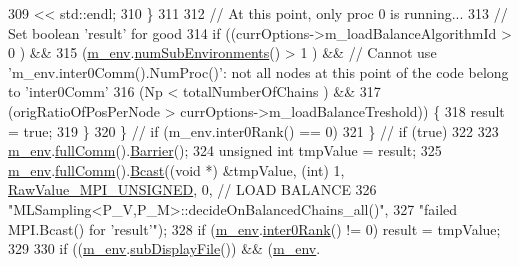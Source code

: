 \begin{DoxyCode}
309                                 << std::endl;
310       \}
311 
312       \textcolor{comment}{// At this point, only proc 0 is running...}
313       \textcolor{comment}{// Set boolean 'result' for good}
314       \textcolor{keywordflow}{if} ((currOptions->m\_loadBalanceAlgorithmId > 0                                 ) &&
315           (\hyperlink{class_q_u_e_s_o_1_1_m_l_sampling_a13f1ca4fe9f94822fe572a743eaced1d}{m\_env}.\hyperlink{class_q_u_e_s_o_1_1_base_environment_ac0345f57e31ef7833e379ed972bd094d}{numSubEnvironments}()            > 1                                
       ) && \textcolor{comment}{// Cannot use 'm\_env.inter0Comm().NumProc()': not all nodes at this point of the code belong to
       'inter0Comm'}
316           (Np                                    < totalNumberOfChains               ) &&
317           (origRatioOfPosPerNode                 > currOptions->m\_loadBalanceTreshold)) \{
318         result = \textcolor{keyword}{true};
319       \}
320     \} \textcolor{comment}{// if (m\_env.inter0Rank() == 0)}
321   \} \textcolor{comment}{// if (true)}
322 
323   \hyperlink{class_q_u_e_s_o_1_1_m_l_sampling_a13f1ca4fe9f94822fe572a743eaced1d}{m\_env}.\hyperlink{class_q_u_e_s_o_1_1_base_environment_a0b0779b41ff304058856e97e1d16b4d4}{fullComm}().\hyperlink{class_q_u_e_s_o_1_1_mpi_comm_a4059971c30e023b272fccaa6aa00c426}{Barrier}();
324   \textcolor{keywordtype}{unsigned} \textcolor{keywordtype}{int} tmpValue = result;
325   \hyperlink{class_q_u_e_s_o_1_1_m_l_sampling_a13f1ca4fe9f94822fe572a743eaced1d}{m\_env}.\hyperlink{class_q_u_e_s_o_1_1_base_environment_a0b0779b41ff304058856e97e1d16b4d4}{fullComm}().\hyperlink{class_q_u_e_s_o_1_1_mpi_comm_abd6af8db8b0c7fd2f5b62e26477a9537}{Bcast}((\textcolor{keywordtype}{void} *) &tmpValue, (\textcolor{keywordtype}{int}) 1, 
      \hyperlink{_mpi_comm_8h_a06cbfbc33436f6e0dc8a48ff3c49bdfc}{RawValue\_MPI\_UNSIGNED}, 0, \textcolor{comment}{// LOAD BALANCE}
326                          \textcolor{stringliteral}{"MLSampling<P\_V,P\_M>::decideOnBalancedChains\_all()"},
327                          \textcolor{stringliteral}{"failed MPI.Bcast() for 'result'"});
328   \textcolor{keywordflow}{if} (\hyperlink{class_q_u_e_s_o_1_1_m_l_sampling_a13f1ca4fe9f94822fe572a743eaced1d}{m\_env}.\hyperlink{class_q_u_e_s_o_1_1_base_environment_ae106b5bb8a80b655b88b3a26b1e7c185}{inter0Rank}() != 0) result = tmpValue;
329 
330   \textcolor{keywordflow}{if} ((\hyperlink{class_q_u_e_s_o_1_1_m_l_sampling_a13f1ca4fe9f94822fe572a743eaced1d}{m\_env}.\hyperlink{class_q_u_e_s_o_1_1_base_environment_a8a0064746ae8dddfece4229b9ad374d6}{subDisplayFile}()) && (\hyperlink{class_q_u_e_s_o_1_1_m_l_sampling_a13f1ca4fe9f94822fe572a743eaced1d}{m\_env}.

\end{DoxyCode}
